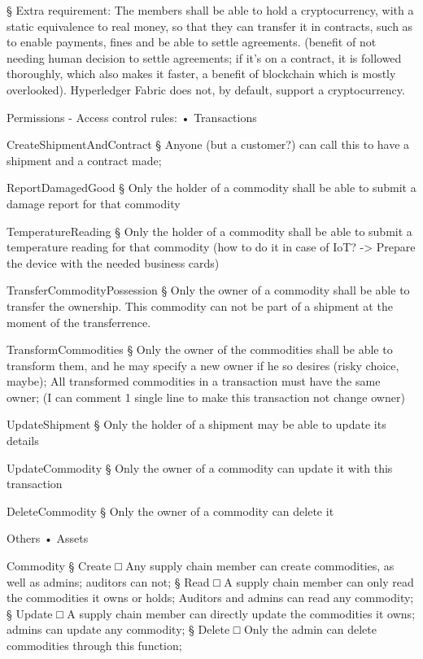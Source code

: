 			§ Extra requirement: The members shall be able to hold a cryptocurrency, with a static equivalence to real money, so that they can transfer it in contracts, such as to enable payments, fines and be able to settle agreements. (benefit of not needing human decision to settle agreements; if it's on a contract, it is followed thoroughly, which also makes it faster, a benefit of blockchain which is mostly overlooked). Hyperledger Fabric does not, by default, support a cryptocurrency.

Permissions - Access control rules:
	• Transactions
		\par CreateShipmentAndContract
			§ Anyone (but a customer?) can call this to have a shipment and a contract made;
		\par ReportDamagedGood
			§ Only the holder of a commodity shall be able to submit a damage report for that commodity
		\par TemperatureReading
			§ Only the holder of a commodity shall be able to submit a temperature reading for that commodity (how to do it in case of IoT? -> Prepare the device with the needed business cards)
		\par TransferCommodityPossession
			§ Only the owner of a commodity shall be able to transfer the ownership. This commodity can not be part of a shipment at the moment of the transferrence. 
		\par TransformCommodities
			§ Only the owner of the commodities shall be able to transform them, and he may specify a new owner if he so desires (risky choice, maybe); All transformed commodities in a transaction must have the same owner; (I can comment 1 single line to make this transaction not change owner)
		\par UpdateShipment
			§ Only the holder of a shipment may be able to update its details
		\par UpdateCommodity
			§ Only the owner of a commodity can update it with this transaction
		\par DeleteCommodity
			§ Only the owner of a commodity can delete it
		\par Others
	• Assets
		\par Commodity
			§ Create
				□ Any supply chain member can create commodities, as well as admins; auditors can not;
			§ Read
				□ A supply chain member can only read the commodities it owns or holds; Auditors and admins can read any commodity;
			§ Update
				□ A supply chain member can directly update the commodities it owns; admins can update any commodity;
			§ Delete
				□ Only the admin can delete commodities through this function;
